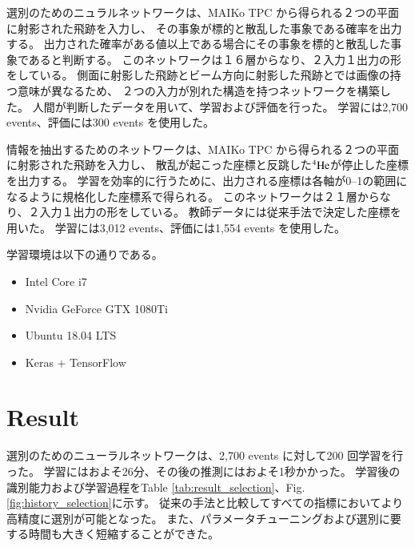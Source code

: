 \documentclass{jps-cp}
\begin{document}
選別のためのニュラルネットワークは、MAIKo TPC から得られる２つの平面に射影された飛跡を入力し、
その事象が標的と散乱した事象である確率を出力する。
出力された確率がある値以上である場合にその事象を標的と散乱した事象であると判断する。
このネットワークは１６層からなり、２入力１出力の形をしている。
側面に射影した飛跡とビーム方向に射影した飛跡とでは画像の持つ意味が異なるため、
２つの入力が別れた構造を持つネットワークを構築した。
人間が判断したデータを用いて、学習および評価を行った。
学習には2,700 events、評価には300 events を使用した。

情報を抽出するためのネットワークは、MAIKo TPC から得られる２つの平面に射影された飛跡を入力し、
散乱が起こった座標と反跳した${}^{4}\rm{He}$が停止した座標を出力する。
学習を効率的に行うために、出力される座標は各軸が0--1の範囲になるように規格化した座標系で得られる。
このネットワークは２１層からなり、２入力１出力の形をしている。
教師データには従来手法で決定した座標を用いた。
学習には3,012 events、評価には1,554 events を使用した。

学習環境は以下の通りである。
\begin{itemize}
\item Intel Core i7
\item Nvidia GeForce GTX 1080Ti
\item Ubuntu 18.04 LTS
\item Keras + TensorFlow
\end{itemize}

\section{Result}
選別のためのニューラルネットワークは、2,700 events に対して200 回学習を行った。
学習にはおよそ26分、その後の推測にはおよそ1秒かかった。
学習後の識別能力および学習過程をTable \ref{tab:result_selection}、Fig. \ref{fig:history_selection}に示す。
従来の手法と比較してすべての指標においてより高精度に選別が可能となった。
また、パラメータチューニングおよび選別に要する時間も大きく短縮することができた。
\end{document}
